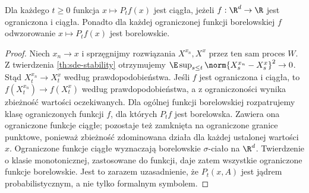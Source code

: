 \begin{lemat}
\label{lem:sde-kernel}
Dla każdego $t\ge0$ funkcja $x\mapsto P_tf(x)$
jest ciągła, jeżeli $f:\R^d\to\R$ jest ograniczona
i ciągła. Ponadto dla każdej ograniczonej funkcji
borelowskiej $f$ odwzorowanie $x\mapsto P_tf(x)$
jest borelowskie.
\end{lemat}
\begin{proof}
Niech $x_n\to x$ i sprzęgnijmy rozwiązania
$X^{x_n},X^x$ przez ten sam proces $W$.
Z twierdzenia \ref{th:sde-stability} otrzymujemy
$\E\sup_{s\le t}\norm{X_s^{x_n}-X_s^x}^2\to0$.
Stąd $X_t^{x_n}\to X_t^x$ według prawdopodobieństwa.
Jeśli $f$ jest ograniczona i ciągła, to
$f(X_t^{x_n})\to f(X_t^x)$ według prawdopodobieństwa,
a z ograniczoności wynika zbieżność wartości oczekiwanych.
Dla ogólnej funkcji borelowskiej rozpatrujemy klasę
ograniczonych funkcji $f$, dla których $P_tf$ jest
borelowska. Zawiera ona ograniczone funkcje ciągłe;
pozostaje też zamknięta na ograniczone granice punktowe,
ponieważ zbieżność zdominowana działa dla każdej
ustalonej wartości $x$. Ograniczone funkcje ciągłe
wyznaczają borelowskie $\sigma$-ciało na $\R^d$.
Twierdzenie o klasie monotonicznej, zastosowane do
funkcji, daje zatem wszystkie ograniczone funkcje
borelowskie. Jest to zarazem uzasadnienie, że
$P_t(x,A)$ jest jądrem probabilistycznym, a nie
tylko formalnym symbolem.
\end{proof}

